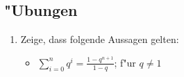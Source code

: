 \subsection{"Ubungen}
\begin{enumerate}
\item Zeige, dass folgende Aussagen gelten:
\begin{itemize}
\item $\sum\limits_{i=0}^{n} q^i = \frac{1-q^{n+1}}{1-q}$; f"ur $q \neq 1$
\end{itemize}
\end{enumerate}